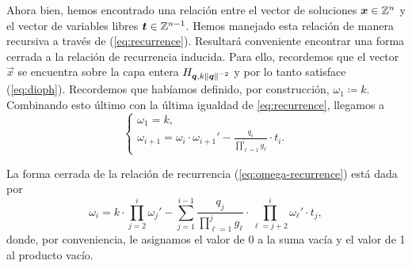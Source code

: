Ahora bien, hemos encontrado una relación entre el vector de soluciones $\boldsymbol{x} \in \mathbb{Z}^n$ y el
vector de variables libres $\boldsymbol{t} \in \mathbb{Z}^{n-1}$. Hemos manejado esta relación de manera recursiva
a través de (\ref{eq:recurrence}). Resultará conveniente encontrar una forma cerrada a la relación
de recurrencia inducida. Para ello, recordemos que el vector $\vec{x}$ se encuentra sobre la capa entera
$H_{\boldsymbol{q}, k\left\lVert \boldsymbol{q} \right\rVert^{-2}}$ y por lo tanto satisface (\ref{eq:dioph}). Recordemos que
habíamos definido, por construcción, $\omega_1 \coloneq k$. Combinando esto último con la última
igualdad de \eqref{eq:recurrence}, llegamos a
\begin{equation}
	\label{eq:omega-recurrence}
	\begin{cases}
		\omega_1 = k, \\
		\omega_{i + 1} = \omega_i \cdot \omega_{i + 1}' - \frac{q_i}{\prod_{\ell=1}^{i}g_\ell} \cdot t_i.
	\end{cases}
\end{equation}
\begin{lemma}
	La forma cerrada de la relación de recurrencia (\ref{eq:omega-recurrence}) está dada por
	\begin{equation}
		\label{eq:omega-formula}
		\omega_i =
		k \cdot \prod_{j=2}^{i} \omega_j'
		- \sum_{j=1}^{i - 1}\frac{q_j}{\prod_{\ell=1}^{j}g_\ell}
		\cdot \prod_{\ell=j+2}^{i}\omega_\ell' \cdot t_j,
	\end{equation}
	donde, por conveniencia, le asignamos el valor de 0 a la suma vacía y el valor de 1 al producto
	vacío.
\end{lemma}

